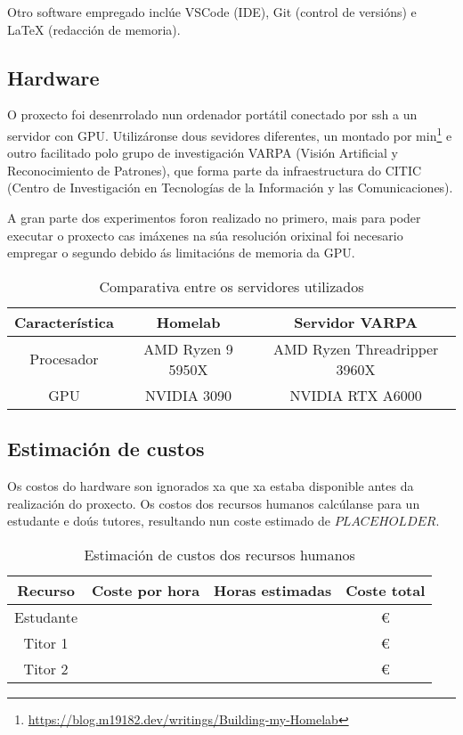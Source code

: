 Otro software empregado inclúe VSCode (IDE), Git (control de versións) e LaTeX (redacción de memoria).

\subsection{Hardware}
\label{subsec:Hardware}

O proxecto foi desenrrolado nun ordenador portátil conectado por ssh a un servidor con GPU. 
Utilizáronse dous sevidores diferentes, un montado por min\footnote{\url{https://blog.m19182.dev/writings/Building-my-Homelab}} e outro facilitado polo grupo de investigación VARPA (Visión Artificial y Reconocimiento de Patrones),
que forma parte da infraestructura do CITIC (Centro de Investigación en Tecnologías de la Información y las Comunicaciones).

A gran parte dos experimentos foron realizado no primero, mais para poder executar o proxecto cas imáxenes na súa resolución orixinal foi necesario empregar o segundo 
debido ás limitacións de memoria da GPU. 

\begin{table}[h]
\centering
\begin{tabular}{|c|c|c|}
\hline
\textbf{Característica} & \textbf{Homelab} & \textbf{Servidor VARPA} \\ \hline
Procesador & AMD Ryzen 9 5950X&  AMD Ryzen Threadripper 3960X \\ \hline
GPU & NVIDIA 3090 & NVIDIA RTX A6000  \\ \hline
\end{tabular}
\caption{Comparativa entre os servidores utilizados}
\label{tab:comparativa_servidores}
\end{table}


\subsection{Estimación de custos}
\label{subsec:Estimación de custos}

Os costos do hardware son ignorados xa que xa estaba disponible antes da realización do proxecto.
Os costos dos recursos humanos calcúlanse para un estudante e doús tutores, resultando nun coste estimado de $PLACEHOLDER$.

\begin{table}[h]
\centering
\begin{tabular}{|c|c|c|c|}
\hline
\textbf{Recurso} & \textbf{Coste por hora} &\textbf{Horas estimadas} & \textbf{Coste total} \\ \hline
Estudante & & & € \\ \hline
Titor 1 & & & € \\ \hline
Titor 2 & & & € \\ \hline
\end{tabular}
\caption{Estimación de custos dos recursos humanos}
\label{tab:estimacion_custos}
\end{table}
